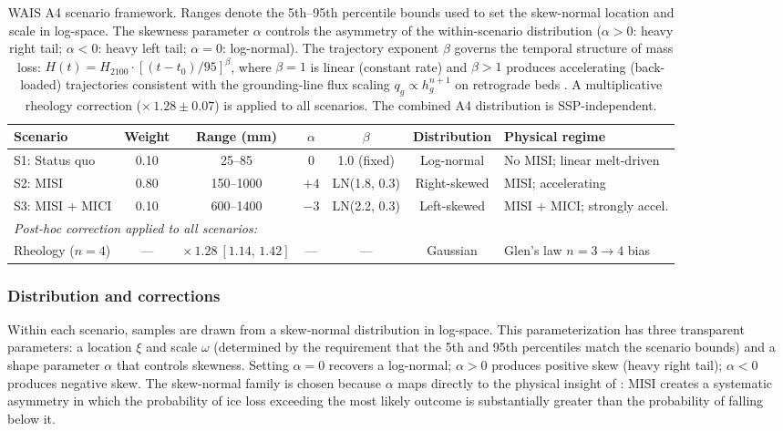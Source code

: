 \documentclass[11pt]{article}
\begin{document}
\begin{table}[ht]
\centering
\caption{WAIS A4 scenario framework. Ranges denote the 5th--95th percentile bounds used to set the skew-normal location and scale in log-space. The skewness parameter $\alpha$ controls the asymmetry of the within-scenario distribution ($\alpha > 0$: heavy right tail; $\alpha < 0$: heavy left tail; $\alpha = 0$: log-normal). The trajectory exponent $\beta$ governs the temporal structure of mass loss: $H(t) = H_{2100}\cdot[(t - t_0)/95]^\beta$, where $\beta = 1$ is linear (constant rate) and $\beta > 1$ produces accelerating (back-loaded) trajectories consistent with the grounding-line flux scaling $q_g \propto h_g^{n+1}$ on retrograde beds \citep{Schoof2007}. A multiplicative rheology correction ($\times\,1.28 \pm 0.07$) is applied to all scenarios. The combined A4 distribution is SSP-independent.}
\label{tab:wais_scenarios}
\smallskip
\begin{tabular}{l c c c c c l}
\toprule
Scenario & Weight & Range (mm) & $\alpha$ & $\beta$ & Distribution & Physical regime \\
\midrule
S1: Status quo   & 0.10 & 25--85     & 0    & 1.0 (fixed) & Log-normal  & No MISI; linear melt-driven \\
S2: MISI         & 0.80 & 150--1000  & $+4$ & LN(1.8, 0.3) & Right-skewed & MISI; accelerating \\
S3: MISI + MICI  & 0.10 & 600--1400  & $-3$ & LN(2.2, 0.3) & Left-skewed  & MISI + MICI; strongly accel. \\
\midrule
\multicolumn{7}{l}{\textit{Post-hoc correction applied to all scenarios:}} \\
Rheology ($n=4$) & ---  & $\times\,1.28\ [1.14,\,1.42]$ & --- & --- & Gaussian & Glen's law $n=3 \to 4$ bias \\
\bottomrule
\end{tabular}
\end{table}

\subsubsection{Distribution and corrections}

Within each scenario, samples are drawn from a skew-normal distribution in log-space. This parameterization has three transparent parameters: a location $\xi$ and scale $\omega$ (determined by the requirement that the 5th and 95th percentiles match the scenario bounds) and a shape parameter $\alpha$ that controls skewness. Setting $\alpha = 0$ recovers a log-normal; $\alpha > 0$ produces positive skew (heavy right tail); $\alpha < 0$ produces negative skew. The skew-normal family is chosen because $\alpha$ maps directly to the physical insight of \citet{Robel2019}: MISI creates a systematic asymmetry in which the probability of ice loss exceeding the most likely outcome is substantially greater than the probability of falling below it.
\end{document}
